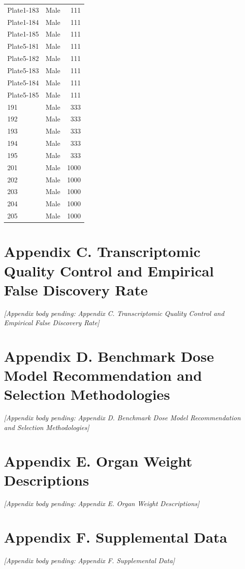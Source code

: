 \begin{longtable}{l l r}
Plate1-183 & Male & 111 \\
Plate1-184 & Male & 111 \\
Plate1-185 & Male & 111 \\
Plate5-181 & Male & 111 \\
Plate5-182 & Male & 111 \\
Plate5-183 & Male & 111 \\
Plate5-184 & Male & 111 \\
Plate5-185 & Male & 111 \\
191 & Male & 333 \\
192 & Male & 333 \\
193 & Male & 333 \\
194 & Male & 333 \\
195 & Male & 333 \\
201 & Male & 1000 \\
202 & Male & 1000 \\
203 & Male & 1000 \\
204 & Male & 1000 \\
205 & Male & 1000 \\
\bottomrule
\end{longtable}

\section{Appendix C. Transcriptomic Quality Control and Empirical False Discovery Rate}

\emph{[Appendix body pending: Appendix C. Transcriptomic Quality Control and Empirical False Discovery Rate]}

\section{Appendix D. Benchmark Dose Model Recommendation and Selection Methodologies}

\emph{[Appendix body pending: Appendix D. Benchmark Dose Model Recommendation and Selection Methodologies]}

\section{Appendix E. Organ Weight Descriptions}

\emph{[Appendix body pending: Appendix E. Organ Weight Descriptions]}

\section{Appendix F. Supplemental Data}

\emph{[Appendix body pending: Appendix F. Supplemental Data]}
